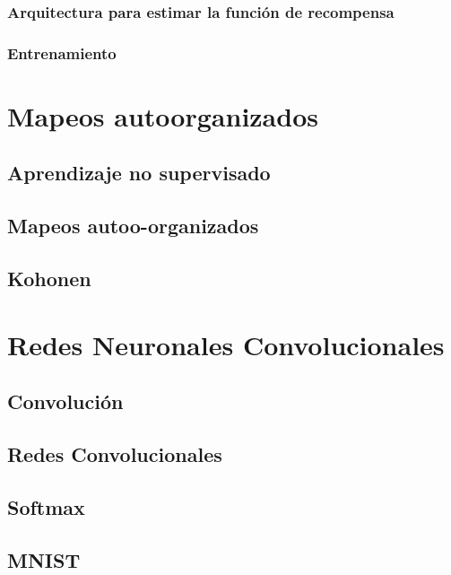 \documentclass[12pt,openany]{book}
\begin{document}
\subsection{Arquitectura para estimar la función de recompensa}
\subsection{Entrenamiento}

\chapter{Mapeos autoorganizados}
\section{Aprendizaje no supervisado}
\section{Mapeos autoo-organizados}
\section{Kohonen}

\chapter{Redes Neuronales Convolucionales}
\section{Convolución}
\section{Redes Convolucionales}
\section{Softmax}
\section{MNIST}
\end{document}
